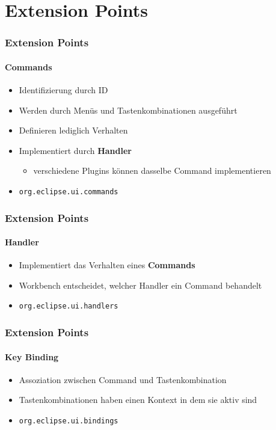 {\section{Extension Points}
\begin{frame}
  \frametitle{Extension Points}
  \framesubtitle{Commands}
  \begin{itemize}
    \item Identifizierung durch ID
    \item Werden durch Menüs und Tastenkombinationen ausgeführt
    \item Definieren lediglich Verhalten
    \item Implementiert durch \textbf{Handler}
    \begin{itemize}
      \item verschiedene Plugins können dasselbe Command implementieren
    \end{itemize}
    \item \texttt{org.eclipse.ui.commands}
  \end{itemize}
\end{frame}

\begin{frame}
  \frametitle{Extension Points}
  \framesubtitle{Handler}
  \begin{itemize}
    \item Implementiert das Verhalten eines \textbf{Commands}
    \item Workbench entscheidet, welcher Handler ein Command behandelt
    \item \texttt{org.eclipse.ui.handlers}
  \end{itemize}
\end{frame}

\begin{frame}
  \frametitle{Extension Points}
  \framesubtitle{Key Binding}
  \begin{itemize}
    \item Assoziation zwischen Command und Tastenkombination
    \item Tastenkombinationen haben einen Kontext in dem sie aktiv sind
    \item \texttt{org.eclipse.ui.bindings}
  \end{itemize}
\end{frame}

}

